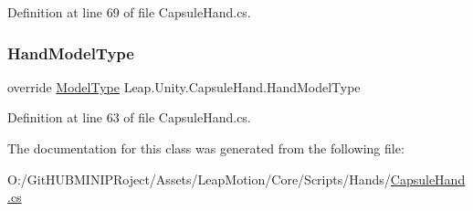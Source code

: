 Definition at line 69 of file Capsule\+Hand.\+cs.

\mbox{\label{class_leap_1_1_unity_1_1_capsule_hand_ab52300f3cc5876781c6a481eb67a71ba}} 
\subsubsection{\texorpdfstring{HandModelType}{HandModelType}}
{\footnotesize\ttfamily override \mbox{\hyperlink{namespace_leap_1_1_unity_a186e5eb0a2b743f1f6b79346f0ab8ad0}{Model\+Type}} Leap.\+Unity.\+Capsule\+Hand.\+Hand\+Model\+Type\hspace{0.3cm}{\ttfamily [get]}}



Definition at line 63 of file Capsule\+Hand.\+cs.



The documentation for this class was generated from the following file\+:\begin{DoxyCompactItemize}
\item 
O\+:/\+Git\+H\+U\+B\+M\+I\+N\+I\+P\+Roject/\+Assets/\+Leap\+Motion/\+Core/\+Scripts/\+Hands/\mbox{\hyperlink{_capsule_hand_8cs}{Capsule\+Hand.\+cs}}\end{DoxyCompactItemize}
